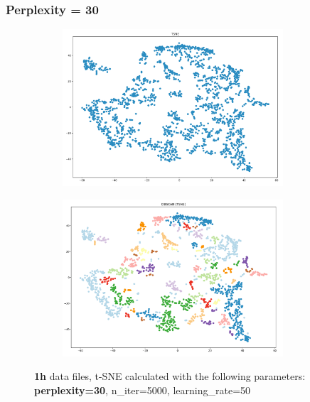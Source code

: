 \subsubsection{Perplexity = 30}
\begin{figure}[H]
  \centering
  \begin{subfigure}{.5\textwidth}
    \centering
    \includegraphics[width=0.9\textwidth]{./images/tsneParametersTest/perplexity/perp30-1hTSNE.png}
  \end{subfigure}%
  \begin{subfigure}{.5\textwidth}
    \centering
    \includegraphics[width=0.9\textwidth]{./images/tsneParametersTest/perplexity/perp30-1hDBSCAN.png}
  \end{subfigure}
	\caption{\textbf{1h} data files, t-SNE calculated with the following parameters: \textbf{perplexity=30}, n\_iter=5000, learning\_rate=50}
  \label{figure:1hperp30TSNE}
\end{figure}

